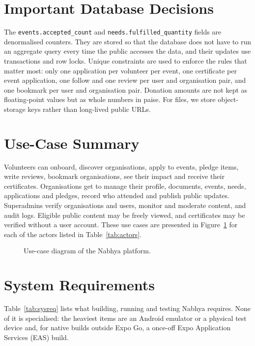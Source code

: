 \clearpage

\section{Important Database Decisions}
The \texttt{events.accepted\_count} and \texttt{needs.fulfilled\_quantity} fields are denormalised counters. They are stored so that the database does not have to run an aggregate query every time the public accesses the data, and their updates use transactions and row locks. Unique constraints are used to enforce the rules that matter most: only one application per volunteer per event, one certificate per event application, one follow and one review per user and organisation pair, and one bookmark per user and organisation pair. Donation amounts are not kept as floating-point values but as whole numbers in paise. For files, we store object-storage keys rather than long-lived public URLs.

\section{Use-Case Summary}
Volunteers can onboard, discover organisations, apply to events, pledge items, write reviews, bookmark organisations, see their impact and receive their certificates. Organisations get to manage their profile, documents, events, needs, applications and pledges, record who attended and publish public updates. Superadmins verify organisations and users, monitor and moderate content, and audit logs. Eligible public content may be freely viewed, and certificates may be verified without a user account. These use cases are presented in Figure~\ref{fig:use-case} for each of the actors listed in Table~\ref{tab:actors}.

\begin{figure}[H]
    \centering
    \caption{Use-case diagram of the Nabhya platform.}
    \label{fig:use-case}
\end{figure}

\section{System Requirements}
\label{sec:system-requirements}
Table~\ref{tab:sysreq} lists what building, running and testing Nabhya requires. None of it is specialised: the heaviest items are an Android emulator or a physical test device and, for native builds outside Expo Go, a once-off Expo Application Services (EAS) build.

